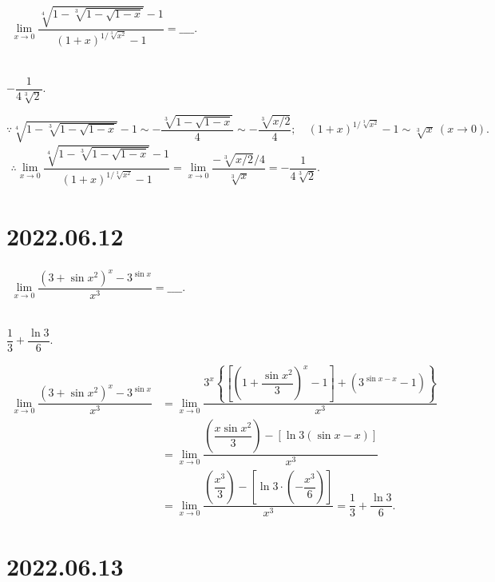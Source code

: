\documentclass[lang=cn,12pt]{elegantbook}
\begin{document}
$\begin{aligned}
    \lim\limits_{x\to0} \dfrac{\sqrt[4]{1-\sqrt[3]{1-\sqrt{1- x}}}-1}
	{(1+x)^{1/\sqrt[3]{x^2}}-1}
    = \_\_\_\_.
\end{aligned}$
\\ \\

\begin{solution}
	$-\dfrac{1}{4\sqrt[3]{2}}.$

	\noindent
    $\because \sqrt[4]{1-\sqrt[3]{1-\sqrt{1- x}}}-1\sim -\dfrac{\sqrt[3]{1-\sqrt{1- x}}}{4}
	    \sim -\dfrac{\sqrt[3]{x/2}}{4};\quad \left(1+x\right)^{1/\sqrt[3]{x^2}}-1
		\sim \sqrt[3]{x}\ (x\to 0).$
	$\begin{aligned}
		\therefore \lim\limits_{x\to0} \dfrac{\sqrt[4]{1-\sqrt[3]{1-\sqrt{1- x}}}-1}
			{(1+x)^{1/\sqrt[3]{x^2}}-1} = \lim\limits_{x\to0} \dfrac{-\sqrt[3]{x/2}/4}
			{\sqrt[3]{x}}=-\dfrac{1}{4\sqrt[3]{2}}.
	\end{aligned}$
\end{solution}


\section*{2022.06.12}

$\begin{aligned}
    \lim\limits_{x\to0} \dfrac{\left(3+\sin x^2\right)^x-3^{\sin x}}{x^3}
    = \_\_\_\_.
\end{aligned}$
\\ \\

\begin{solution}
	$\dfrac{1}{3}+\dfrac{\ln 3}{6}.$

	$\begin{aligned}
		\lim\limits_{x\to0} \dfrac{\left(3+\sin x^2\right)^x-3^{\sin x}}{x^3}
		&= \lim\limits_{x\to0} \dfrac{3^x\left\{\left[\left(1+\dfrac{\sin x^2}{3}\right)^x
			-1\right] + \left(3^{\sin x - x} - 1\right)\right\}}{x^3}\\
		&= \lim\limits_{x\to0} \dfrac{\left(\dfrac{x\sin x^2}{3}\right)-
			\left[\ln 3\left(\sin x - x\right)\right]}{x^3}\\
		&= \lim\limits_{x\to0} \dfrac{\left(\dfrac{x^3}{3}\right)-
			\left[\ln 3 \cdot \left(-\dfrac{x^3}{6}\right)\right]}{x^3}
		=\dfrac{1}{3}+\dfrac{\ln 3}{6}.
	\end{aligned}$
\end{solution}

\section*{2022.06.13}
\end{document}
